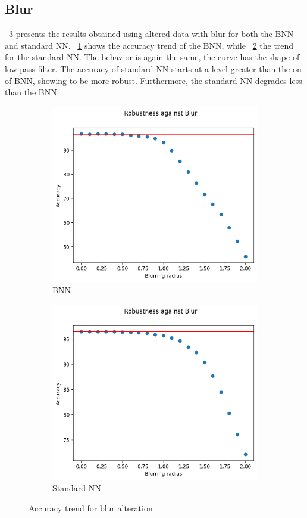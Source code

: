 \subsection{Blur}

\Fig~\ref{fig:acc_bl_wu} presents the results obtained using altered data with blur for both the BNN and standard NN. \Fig~\ref{fig:bl_acc_wu_bnn} shows the accuracy trend of the BNN, while \Fig~\ref{fig:blur_ann} the trend for the standard NN. The behavior is again the same, the curve has the shape of low-pass filter. The accuracy of standard NN starts at a level greater than the on of BNN, showing to be more robust. Furthermore, the standard NN degrades less than the BNN.

\begin{figure}[h]
	\centering
	\begin{subfigure}{.5\textwidth}
		\centering
		\includegraphics[width=0.8\linewidth]{ImageFiles/EvalBNN/BL/WU/acc}
		\caption{BNN}
		\label{fig:bl_acc_wu_bnn}
	\end{subfigure}%
	\begin{subfigure}{.5\textwidth}
		\centering
		\includegraphics[width=0.8\linewidth]{ImageFiles/EvalANN/blur_ann}
		\caption{Standard NN}
		\label{fig:blur_ann}
	\end{subfigure}
	\caption{Accuracy trend for blur alteration}
	\label{fig:acc_bl_wu}
\end{figure}

